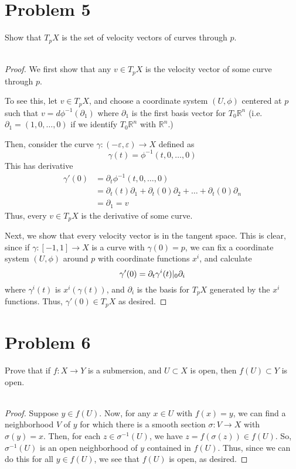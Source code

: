 \documentclass[fontsize=11pt]{scrartcl} %
\numberwithin{equation}{section} %
\numberwithin{figure}{section} %
\numberwithin{table}{section} %
\newcommand{\R}{\mathbb{R}}
\begin{document}
\newpage

\section*{Problem 5}
Show that $T_pX$ is the set of velocity vectors of curves through $p$.
\\
\\
\begin{proof}
    We first show that any $v\in T_pX$ is the velocity vector of some curve
    through $p$.

    To see this, let $v\in T_pX$, and choose a coordinate system $(U,\phi)$
    centered at $p$ such that $v = d\phi^{-1}(\partial_1)$ where $\partial_1$ is
    the first basis vector for $T_0\R^n$ (i.e. $\partial_1 = (1,0,\dots,0)$ if
    we identify $T_0\R^n$ with $\R^n$.)

    Then, consider the curve $\gamma:(-\varepsilon,\varepsilon)\to X$ defined as
    \[
        \gamma(t) = \phi^{-1}(t,0,\dots,0)
    \]
    This has derivative
    \[
        \begin{aligned}
        \gamma'(0) &= \partial_t\phi^{-1}(t,0,\dots,0)\\
        &= \partial_t (t)\partial_1 + \partial_t (0)\partial_2 + \dots +
        \partial_t(0)\partial_n\\
        &= \partial_1 = v
    \end{aligned}
    \]
    Thus, every $v\in T_pX$ is the derivative of some curve.

    Next, we show that every velocity vector is in the tangent space. This is
    clear, since if $\gamma:[-1,1]\to X$ is a curve with $\gamma(0)=p$, we can
    fix a coordinate system $(U,\phi)$ around $p$ with coordinate functions
    $x^i$, and calculate
    \[
        \gamma'(0) = \partial_t\gamma^i(t)|_0\partial_i\\
    \]
    where $\gamma^i(t)$ is $x^i(\gamma(t))$, and $\partial_i$ is the basis for
    $T_pX$ generated by the $x^i$ functions. Thus,
    $\gamma'(0)\in T_pX$ as desired.
\end{proof}
\newpage
\section*{Problem 6}
Prove that if $f:X\to Y$ is a submersion, and $U\subset X$ is open, then
$f(U)\subset Y$ is open.
\\
\\
\begin{proof}
    Suppose $y\in f(U)$. Now, for any $x\in U$ with $f(x) = y$, we can find a
    neighborhood $V$ of $y$ for which there is a smooth section $\sigma:V\to X$
    with $\sigma(y)=x$. Then, for each $z\in \sigma^{-1}(U)$, we have
    $z=f(\sigma(z))\in f(U)$. So, $\sigma^{-1}(U)$ is an open neighborhood of
    $y$ contained in $f(U)$. Thus, since we can do this for all $y\in f(U)$, we
    see that $f(U)$ is open, as desired.
\end{proof}
\end{document}
